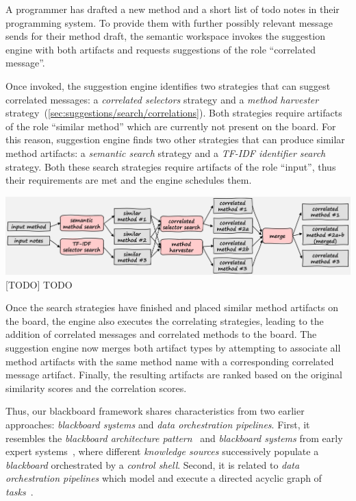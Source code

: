 \begin{example}
	A programmer has drafted a new method and a short list of todo notes in their programming system.
	To provide them with further possibly relevant message sends for their method draft, the semantic workspace invokes the suggestion engine with both artifacts and requests suggestions of the role ``correlated message''.

	Once invoked, the suggestion engine identifies two strategies that can suggest correlated messages: a \emph{correlated selectors} strategy and a \emph{method harvester} strategy~(\cref{sec:suggestions/search/correlations}).
	Both strategies require artifacts of the role ``similar method'' which are currently not present on the board.
	For this reason, suggestion engine finds two other strategies that can produce similar method artifacts: a \emph{semantic search} strategy and a \emph{TF-IDF identifier search} strategy.
	Both these search strategies require artifacts of the role ``input'', thus their requirements are met and the engine schedules them.

	\begin{center}
		\includegraphics[width=\textwidth]{02_suggestions/example.png}
		{
			TODO
		}
		\label{fig:design/suggestions/example}
	\end{center}

	Once the search strategies have finished and placed similar method artifacts on the board, the engine also executes the correlating strategies, leading to the addition of correlated messages and correlated methods to the board.
	The suggestion engine now merges both artifact types by attempting to associate all method artifacts with the same method name with a corresponding correlated message artifact.
	Finally, the resulting artifacts are ranked based on the original similarity scores and the correlation scores.
\end{example}

Thus, our blackboard framework shares characteristics from two earlier approaches: \emph{blackboard systems} and \emph{data orchestration pipelines}.
First, it resembles the \emph{blackboard architecture pattern}~\cite[p.~71ff.]{buschmann1996pattern} and \emph{blackboard systems} from early expert systems~\cite{hayes1985blackboard}, where different \emph{knowledge sources} successively populate a \emph{blackboard} orchestrated by a \emph{control shell}.
Second, it is related to \emph{data orchestration pipelines} which model and execute a directed acyclic graph of \emph{tasks}~\cite{talia2013workflow}.

